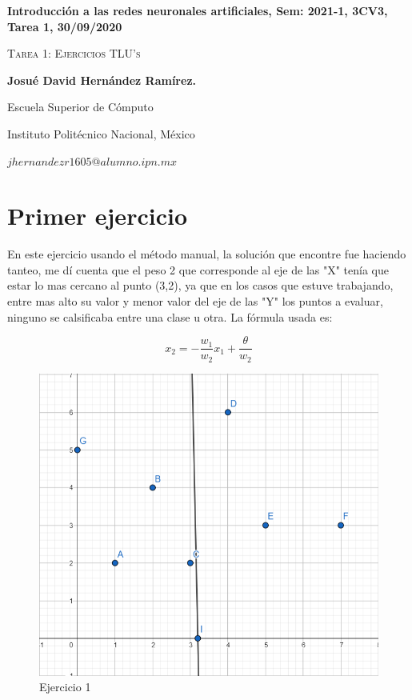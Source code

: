 \documentclass[12pt,twoside]{article}
\date{}
\begin{document}
\centerline{\bf Introducción a las redes neuronales artificiales, Sem: 2021-1, 3CV3, Tarea 1, 30/09/2020}
\centerline{}
\centerline{}
\begin{center}
\Large{\textsc{Tarea 1: Ejercicios TLU's}}
\end{center}
\centerline{}
\centerline{\bf {Josu\'e David Hern\'andez Ram\'irez.}}
\centerline{}
\centerline{Escuela Superior de C\'omputo}
\centerline{Instituto Polit\'ecnico Nacional, M\'exico}
\centerline{$jhernandezr1605@alumno.ipn.mx$}
\newtheorem{Theorem}{\quad Theorem}[section]
\newtheorem{Definition}[Theorem]{\quad Definition}
\newtheorem{Corollary}[Theorem]{\quad Corollary}
\newtheorem{Lemma}[Theorem]{\quad Lemma}
\newtheorem{Example}[Theorem]{\quad Example}
\bigskip
\section{Primer ejercicio}


    En este ejercicio usando el método manual, la solución que encontre fue
haciendo tanteo, me dí cuenta que el peso 2 que corresponde al eje de las
"X" tenía que estar lo mas cercano al punto (3,2), ya que en los casos
que estuve trabajando, entre mas alto su valor y menor valor del eje de las "Y"
los puntos a evaluar, ninguno se calsificaba entre una clase u otra. La fórmula
usada es:

$$x_{2} = - \frac{w_{1}}{w_{2}}x_{1} + \frac{\theta}{w_{2}}$$

    \begin{figure}[h!]
        \centering
        \includegraphics[scale=0.25]{./img/ejercicio1}
        \caption{Ejercicio 1}
        \label{fig:ejer1}
    \end{figure}
\end{document}
